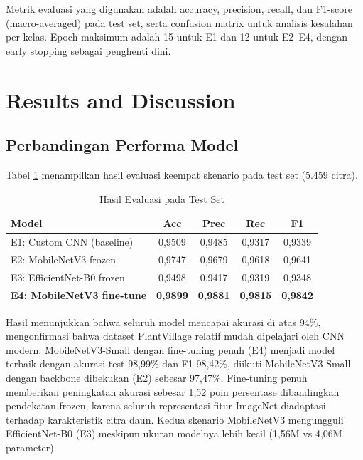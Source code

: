 \documentclass[conference,a4paper]{IEEEtran}
\begin{document}
Metrik evaluasi yang digunakan adalah accuracy, precision, recall, dan F1-score (macro-averaged) pada test set, serta confusion matrix untuk analisis kesalahan per kelas. Epoch maksimum adalah 15 untuk E1 dan 12 untuk E2--E4, dengan early stopping sebagai penghenti dini.

\section{Results and Discussion}

\subsection{Perbandingan Performa Model}
Tabel \ref{tab:results} menampilkan hasil evaluasi keempat skenario pada test set (5.459 citra).

\begin{table}[htbp]
\caption{Hasil Evaluasi pada Test Set}
\label{tab:results}
\begin{center}
\begin{tabular}{@{}lcccc@{}}
\toprule
\textbf{Model} & \textbf{Acc} & \textbf{Prec} & \textbf{Rec} & \textbf{F1} \\
\midrule
E1: Custom CNN (baseline) & 0,9509 & 0,9485 & 0,9317 & 0,9339 \\
E2: MobileNetV3 frozen    & 0,9747 & 0,9679 & 0,9618 & 0,9641 \\
E3: EfficientNet-B0 frozen & 0,9498 & 0,9417 & 0,9319 & 0,9348 \\
\textbf{E4: MobileNetV3 fine-tune} & \textbf{0,9899} & \textbf{0,9881} & \textbf{0,9815} & \textbf{0,9842} \\
\bottomrule
\end{tabular}
\end{center}
\end{table}

Hasil menunjukkan bahwa seluruh model mencapai akurasi di atas 94\%, mengonfirmasi bahwa dataset PlantVillage relatif mudah dipelajari oleh CNN modern. MobileNetV3-Small dengan fine-tuning penuh (E4) menjadi model terbaik dengan akurasi test 98,99\% dan F1 98,42\%, diikuti MobileNetV3-Small dengan backbone dibekukan (E2) sebesar 97,47\%. Fine-tuning penuh memberikan peningkatan akurasi sebesar 1,52 poin persentase dibandingkan pendekatan frozen, karena seluruh representasi fitur ImageNet diadaptasi terhadap karakteristik citra daun. Kedua skenario MobileNetV3 mengungguli EfficientNet-B0 (E3) meskipun ukuran modelnya lebih kecil (1,56M vs 4,06M parameter).
\end{document}
